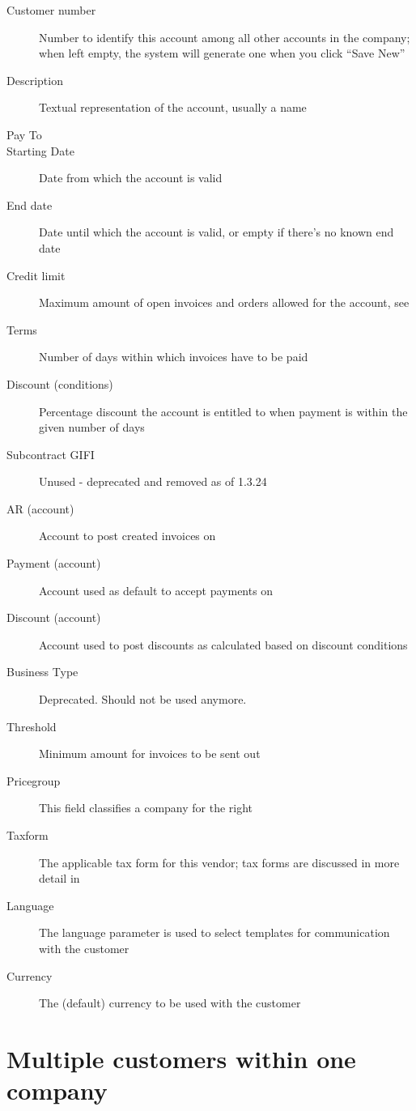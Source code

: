 \begin{description}
\item [Customer number] Number to identify this account among all other accounts in the company;
     when left empty, the system will generate one when you click ``Save New''
\item [Description] Textual representation of the account, usually a name
\item [Pay To] %
\item [Starting Date] Date from which the account is valid
\item [End date] Date until which the account is valid, or empty if there's no known end date
\item [Credit limit] Maximum amount of open invoices and orders allowed for the account, see
\item [Terms] Number of days within which invoices have to be paid
\item [Discount (conditions)] Percentage discount the account is entitled to when payment
         is within the given number of days
\item [Subcontract GIFI] Unused - deprecated and removed as of 1.3.24
\item [AR (account)] Account to post created invoices on
\item [Payment (account)] Account used as default to accept payments on
\item [Discount (account)] Account used to post discounts as calculated based on discount conditions
\item [Business Type] Deprecated. Should not be used anymore.
\item [Threshold] Minimum amount for invoices to be sent out
\item [Pricegroup] This field classifies a company for the right 
\item [Taxform] The applicable tax form for this vendor; tax forms are discussed in more detail in
\item [Language] The language parameter is used to select templates for communication with the customer
\item [Currency] The (default) currency to be used with the customer
\end{description}

\section{Multiple customers within one company}
\label{sec-workflows-customer-multiple-per-company}

